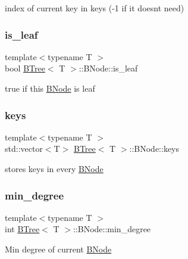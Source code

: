 index of current key in keys (-\/1 if it doesn\textquotesingle{}t need) \mbox{\label{classBTree_1_1BNode_aeea14a23dfc45f162ecbbc736b24014a}} 
\subsubsection{\texorpdfstring{is\+\_\+leaf}{is\_leaf}}
{\footnotesize\ttfamily template$<$typename T $>$ \\
bool \hyperlink{classBTree}{B\+Tree}$<$ T $>$\+::B\+Node\+::is\+\_\+leaf}

true if this \hyperlink{classBTree_1_1BNode}{B\+Node} is leaf \mbox{\label{classBTree_1_1BNode_a5fb27046a502d2a28fc539042a1bfd87}} 
\subsubsection{\texorpdfstring{keys}{keys}}
{\footnotesize\ttfamily template$<$typename T $>$ \\
std\+::vector$<$T$>$ \hyperlink{classBTree}{B\+Tree}$<$ T $>$\+::B\+Node\+::keys}

stores keys in every \hyperlink{classBTree_1_1BNode}{B\+Node} \mbox{\label{classBTree_1_1BNode_a9a108839cbc75c2c207d97140577bd7c}} 
\subsubsection{\texorpdfstring{min\+\_\+degree}{min\_degree}}
{\footnotesize\ttfamily template$<$typename T $>$ \\
int \hyperlink{classBTree}{B\+Tree}$<$ T $>$\+::B\+Node\+::min\+\_\+degree}

Min degree of current \hyperlink{classBTree_1_1BNode}{B\+Node} \mbox{\label{classBTree_1_1BNode_a5856f1fc1eb5e7e936d4deb50dc64a3c}} 
